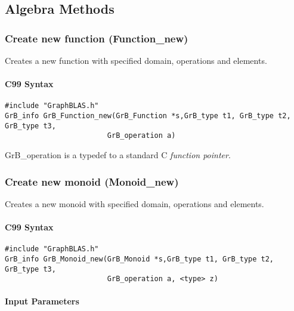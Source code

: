 \subsection{Algebra Methods}


\subsubsection{Create new function ({\sf Function\_new})}

Creates a new function with specified domain, operations and elements.

\paragraph{C99 Syntax}

\begin{verbatim}
#include "GraphBLAS.h"
GrB_info GrB_Function_new(GrB_Function *s,GrB_type t1, GrB_type t2, GrB_type t3,
                        GrB_operation a)
\end{verbatim}

GrB\_operation is a typedef to a standard C \emph{function pointer}.


\subsubsection{Create new monoid ({\sf Monoid\_new})}

Creates a new monoid with specified domain, operations and elements.

\paragraph{C99 Syntax}

\begin{verbatim}
#include "GraphBLAS.h"
GrB_info GrB_Monoid_new(GrB_Monoid *s,GrB_type t1, GrB_type t2, GrB_type t3,
                        GrB_operation a, <type> z)
\end{verbatim}

\paragraph{Input Parameters}

